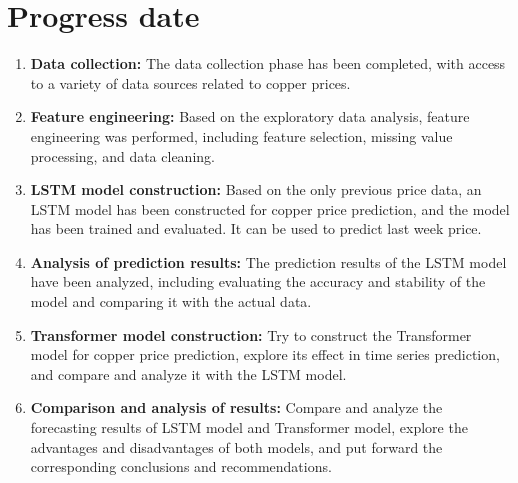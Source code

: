 \documentclass[project-plan]{report-template}
\begin{document}
\section{Progress date}
\begin{enumerate}
    \item \textbf{Data collection:} The data collection phase has been completed, with access to a variety of data sources related to copper prices.
        
    \item \textbf{Feature engineering:} Based on the exploratory data analysis, feature engineering was performed, including feature selection, missing value processing, and data cleaning.
    
    \item \textbf{LSTM model construction:} Based on the only previous price data, an LSTM model has been constructed for copper price prediction, and the model has been trained and evaluated. It can be used to predict last week price.
    
    \item \textbf{Analysis of prediction results:} The prediction results of the LSTM model have been analyzed, including evaluating the accuracy and stability of the model and comparing it with the actual data.
    
    \item \textbf{Transformer model construction:} Try to construct the Transformer model for copper price prediction, explore its effect in time series prediction, and compare and analyze it with the LSTM model.

    \item \textbf{Comparison and analysis of results:} Compare and analyze the forecasting results of LSTM model and Transformer model, explore the advantages and disadvantages of both models, and put forward the corresponding conclusions and recommendations.

\end{enumerate}
\end{document}
